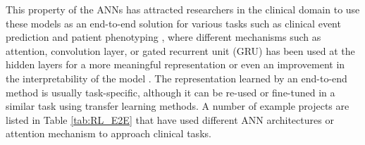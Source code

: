 This property of the ANNs has attracted researchers in the clinical domain to use these models as an end-to-end solution for various tasks such as clinical event prediction and patient phenotyping \cite{AyalaSolares2020deep_survey}, where different mechanisms such as attention, convolution layer, or gated recurrent unit (GRU) has been used at the hidden layers for a more meaningful representation or even an improvement in the interpretability of the model \cite{Mullenbach2018Explainable}. The representation learned by an end-to-end method is usually task-specific, although it can be re-used or fine-tuned in a similar task using transfer learning methods. A number of example projects are listed in Table \ref{tab:RL_E2E} that have used different ANN architectures or attention mechanism to approach clinical tasks.



